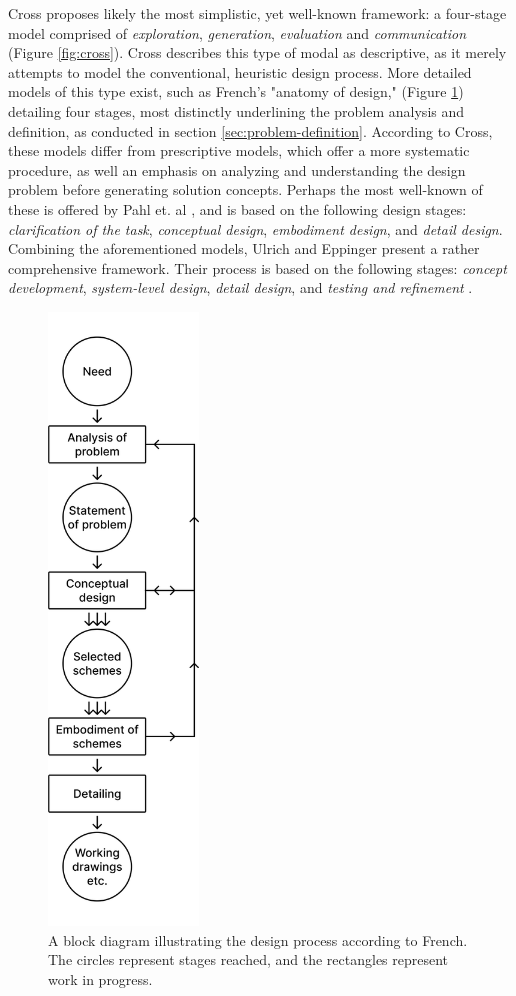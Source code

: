 Cross \cite{cross} proposes likely the most simplistic, yet well-known framework: a four-stage model comprised of \textit{exploration}, \textit{generation}, \textit{evaluation} and \textit{communication} (Figure \ref{fig:cross}). Cross describes this type of modal as descriptive, as it merely attempts to model the conventional, heuristic design process. More detailed models of this type exist, such as French's \cite{french} "anatomy of design," (Figure \ref{fig:french}) detailing four stages, most distinctly underlining the problem analysis and definition, as conducted in section \ref{sec:problem-definition}. According to Cross, these models differ from prescriptive models, which offer a more systematic procedure, as well an emphasis on analyzing and understanding the design problem before generating solution concepts. Perhaps the most well-known of these is offered by Pahl et. al \cite{pahl_beitz}, and is based on the following design stages: \textit{clarification of the task}, \textit{conceptual design}, \textit{embodiment design}, and \textit{detail design}. Combining the aforementioned models, Ulrich and Eppinger present a rather comprehensive framework. Their process is based on the following stages: \textit{concept development}, \textit{system-level design}, \textit{detail design}, and \textit{testing and refinement} \cite{ulrich_eppinger}.

\begin{figure}[H]
  \centering
  \includegraphics[width=4cm]{Pictures/Figures/french.png}
  \caption{A block diagram illustrating the design process according to French. The circles represent stages reached, and the rectangles represent work in progress.}
  \label{fig:french}
\end{figure}

